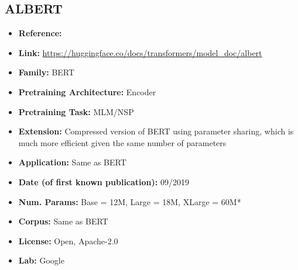 \documentclass{article}
\begin{document}
\subsection{ALBERT}
            \begin{itemize}             %
                \item \textbf{Reference:} \href{https://arxiv.org/abs/1909.11942}{}
                \item \textbf{Link:} \url{https://huggingface.co/docs/transformers/model_doc/albert}
                \item \textbf{Family:} BERT
                \item \textbf{Pretraining Architecture:} Encoder
                \item \textbf{Pretraining Task:} MLM/NSP
                \item \textbf{Extension:} Compressed version of BERT using parameter sharing, which is much more efficient given the same number of parameters
                \item \textbf{Application:} Same as BERT
                \item \textbf{Date (of first known publication):} 09/2019
                \item \textbf{Num. Params:} Base = 12M, Large = 18M, XLarge = 60M*
                \item \textbf{Corpus:} Same as BERT
                \item \textbf{License:} Open, Apache-2.0
                \item \textbf{Lab:} Google
            \end{itemize}

\end{document}

